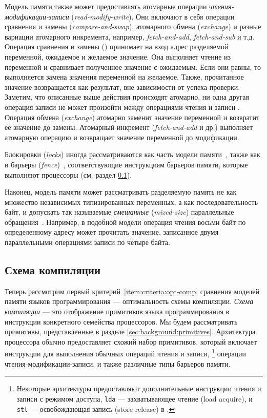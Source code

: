 Модель памяти также может предоставлять атомарные операции 
\emph{чтения-модификации-записи} (\emph{read-modify-write}).
Они включают в себя операции сравнения и замены (\emph{compare-and-swap}), 
атомарного обмена (\emph{exchange}) и разные вариации атомарного инкремента, 
например, \emph{fetch-and-add}, \emph{fetch-and-sub} и т.д. 
Операция сравнения и замены (\CAS) принимает на вход 
адрес разделяемой переменной, ожидаемое и желаемое значение.
Она выполняет чтение из переменной и сравнивает полученное значение 
с ожидаемым. Если они равны, то выполняется замена значения переменной 
на желаемое. Также, прочитанное значение возвращается как результат, 
вне зависимости от успеха проверки. 
Заметим, что описанные выше действия происходят атомарно, 
ни одна другая операция записи не может произойти между 
операциями чтения и записи \CAS.
Операция обмена (\emph{exchange}) атомарно 
заменит значение переменной и возвратит её значение до замены. 
Атомарный инкремент (\emph{fetch-and-add} и др.) выполняет
атомарную операцию и возвращает значение переменной до модификации.  

Блокировки (\emph{locks}) иногда рассматриваются 
как часть модели памяти~\cite{Manson-al:POPL05}, 
также как и барьеры (\emph{fence})~\cite{Batty-al:POPL11},
соответствующие инструкциям барьеров памяти, 
которые выполняют процессоры  
(см. раздел \cref{sec:background:compile}). 

Наконец, модель памяти может рассматривать разделяемую память 
не как множество независимых типизированных переменных, 
а как последовательность байт, и допускать 
так называемые \emph{смешанные} (\emph{mixed-size}) 
параллельные обращения~\cite{Flur-al:POPL17}. 
Например, в подобной модели операция чтения восьми байт по определенному адресу
может прочитать значение, записанное двумя параллельными 
операциями записи по четыре байта.

\subsection{Схема компиляции}
\label{sec:background:compile}

Теперь рассмотрим первый критерий~\ref{item:criteria:opt-comp}
сравнения моделей памяти языков программирования --- 
оптимальность схемы компиляции. 
\emph{Схема компиляции} --- это отображение
примитивов языка программирования в инструкции 
конкретного семейства процессоров.  
Мы будем рассматривать примитивы, представленные в 
разделе \cref{sec:background:primitives}.
Архитектура процессора обычно предоставляет 
схожий набор примитивов, который включает 
инструкции для выполнения обычных операций чтения и записи,%
\footnote{Некоторые архитектуры
предоставляют дополнительные инструкции чтения и 
записи с режимом доступа, \eg 
\eg \texttt{lda} --- захватывающее чтение (load acquire), 
и \texttt{stl} --- освобождающая запись (store release) в .} 
операции чтения-модификации-записи, и 
также различные типы барьеров памяти.

